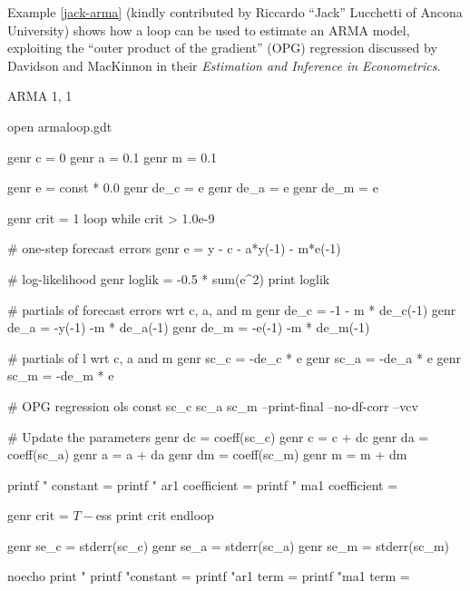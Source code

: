 Example \ref{jack-arma} (kindly contributed by Riccardo ``Jack''
Lucchetti of Ancona University) shows how a loop can be used to
estimate an ARMA model, exploiting the ``outer product of the
gradient'' (OPG) regression discussed by Davidson and MacKinnon in
their \emph{Estimation and Inference in Econometrics}.

\begin{script}[htbp]
  \caption{ARMA 1, 1}
  \label{jack-arma}

\begin{code}
	open armaloop.gdt

	genr c = 0
	genr a = 0.1
	genr m = 0.1

	genr e = const * 0.0
	genr de_c = e
	genr de_a = e
	genr de_m = e

	genr crit = 1
	loop while crit > 1.0e-9

	   # one-step forecast errors
	   genr e = y - c - a*y(-1) - m*e(-1)  

	   # log-likelihood 
	   genr loglik = -0.5 * sum(e^2)
	   print loglik

	   # partials of forecast errors wrt c, a, and m
	   genr de_c = -1 - m * de_c(-1) 
	   genr de_a = -y(-1) -m * de_a(-1)
	   genr de_m = -e(-1) -m * de_m(-1)
   
	   # partials of l wrt c, a and m
	   genr sc_c = -de_c * e
	   genr sc_a = -de_a * e
	   genr sc_m = -de_m * e
   
	   # OPG regression
	   ols const sc_c sc_a sc_m --print-final --no-df-corr --vcv

	   # Update the parameters
	   genr dc = coeff(sc_c) 
	   genr c = c + dc
	   genr da = coeff(sc_a) 
	   genr a = a + da
	   genr dm = coeff(sc_m) 
	   genr m = m + dm

	   printf "  constant        = %
	   printf "  ar1 coefficient = %
	   printf "  ma1 coefficient = %

	   genr crit = $T - $ess
	   print crit
	endloop

	genr se_c = stderr(sc_c)
	genr se_a = stderr(sc_a)
	genr se_m = stderr(sc_m)

	noecho
	print "
	printf "constant = %
	printf "ar1 term = %
	printf "ma1 term = %
\end{code}
\end{script}



